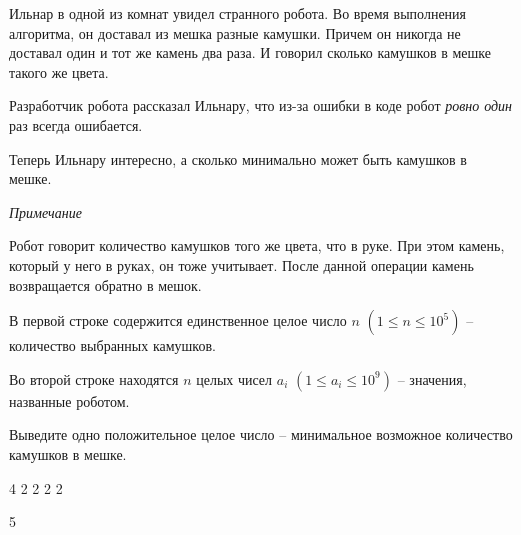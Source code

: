 
Ильнар в одной из комнат увидел странного робота. Во время выполнения алгоритма, он доставал из мешка разные камушки. Причем он никогда не доставал один и тот же камень два раза. И говорил сколько камушков в мешке такого же цвета.

Разработчик робота рассказал Ильнару, что из-за ошибки в коде робот \emph{ровно один} раз всегда ошибается.

Теперь Ильнару интересно, а сколько минимально может быть камушков в мешке.

\emph{Примечание}

Робот говорит количество камушков того же цвета, что в руке. При этом камень, который у него в руках, он тоже учитывает. После данной операции камень возвращается обратно в мешок.


В первой строке содержится единственное целое число $n$ $(1 \le n \le 10^5)$ -- количество выбранных камушков.

Во второй строке находятся $n$ целых чисел $a_i$ $(1 \le a_i \le 10^9)$ -- значения, названные роботом.

\outputfmtSection

Выведите одно положительное целое число -- минимальное возможное количество камушков в мешке.

\exampleSection


\begin{myverbbox}[\small]{\vinput}
4
2 2 2 2
\end{myverbbox}
\begin{myverbbox}[\small]{\voutput}
5
\end{myverbbox}

